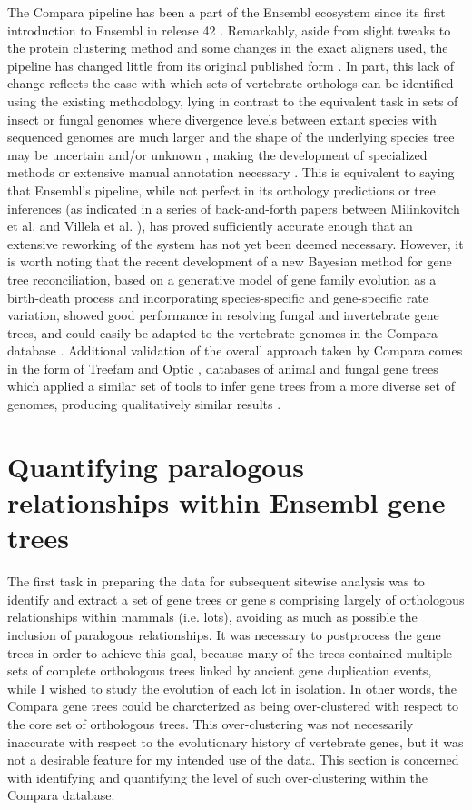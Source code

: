 The Compara pipeline has been a part of the Ensembl ecosystem since
its first introduction to Ensembl in release 42
\citep{Birney2006}. Remarkably, aside from slight tweaks to the
protein clustering method and some changes in the exact aligners used,
the pipeline has changed little from its original published form
\citep{Vilella2009}. In part, this lack of change reflects the ease
with which sets of vertebrate orthologs can be identified using the
existing methodology, lying in contrast to the equivalent task in sets
of insect or fungal genomes where divergence levels between extant
species with sequenced genomes are much larger \citep{Siepel2005} and
the shape of the underlying species tree may be uncertain and/or
unknown \citep{MacKenzie2008a}, making the development of specialized
methods or extensive manual annotation necessary
\citep{Kellis2004,Rasmussen2007}. This is equivalent to saying that
Ensembl's pipeline, while not perfect in its orthology predictions or
tree inferences (as indicated in a series of back-and-forth papers
between Milinkovitch et al. \citeyearpar{Milinkovitch2010} and Villela
et al. \citeyearpar{Vilella2011}), has proved sufficiently accurate
enough that an extensive reworking of the system has not yet been
deemed necessary. However, it is worth noting that the recent
development of a new Bayesian method for gene tree reconciliation,
based on a generative model of gene family evolution as a birth-death
process and incorporating species-specific and gene-specific rate
variation, showed good performance in resolving fungal and
invertebrate gene trees, and could easily be adapted to the vertebrate
genomes in the Compara database . Additional validation of the overall
approach taken by Compara comes in the form of Treefam and Optic
\citep{Ruan2008}, databases of animal and fungal gene trees which
applied a similar set of tools to infer gene trees from a more diverse
set of genomes, producing qualitatively similar results
\citep{Vilella2009}.

\section{Quantifying paralogous relationships within Ensembl gene trees}

The first task in preparing the \cmp data for subsequent sitewise
analysis was to identify and extract a set of gene trees or gene
\subtr{}s comprising largely of orthologous relationships within
mammals (i.e. \acp{lot}), avoiding as much as possible the inclusion
of paralogous relationships. It was necessary to postprocess the \cmp
gene trees in order to achieve this goal, because many of the \cmp
trees contained multiple sets of complete \mammln orthologous trees
linked by ancient gene duplication events, while I wished to study the
evolution of each \mammln \ac{lot} in isolation. In other words, the
Compara gene trees could be charcterized as being over-clustered with
respect to the core set of \mammln orthologous trees. This
over-clustering was not necessarily inaccurate with respect to the
evolutionary history of vertebrate genes, but it was not a desirable
feature for my intended use of the data. This section is concerned
with identifying and quantifying the level of such over-clustering
within the Compara database.

